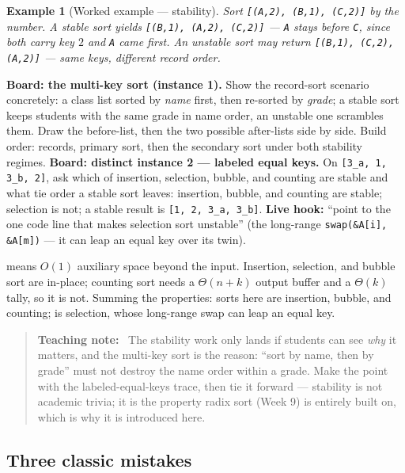 \documentclass[11pt]{article}
\newtheorem{example}{Example}[section]
\newenvironment{teachingaside}{\begin{quote}\small\color{primary-gold}\textbf{Teaching note:}\ }{\end{quote}}
\begin{document}
\begin{example}[Worked example --- stability]
Sort \texttt{[(A,2), (B,1), (C,2)]} by the number. A stable sort yields \texttt{[(B,1), (A,2), (C,2)]} --- \texttt{A} stays before \texttt{C}, since both carry key $2$ and \texttt{A} came first. An unstable sort may return \texttt{[(B,1), (C,2), (A,2)]} --- same keys, different record order.
\end{example}

\textbf{Board: the multi-key sort (instance 1).} Show the record-sort scenario concretely: a class list sorted by \emph{name} first, then re-sorted by \emph{grade}; a stable sort keeps students with the same grade in name order, an unstable one scrambles them. Draw the before-list, then the two possible after-lists side by side. Build order: records, primary sort, then the secondary sort under both stability regimes. \textbf{Board: distinct instance 2 --- labeled equal keys.} On \texttt{[3\_a, 1, 3\_b, 2]}, ask which of insertion, selection, bubble, and counting are stable and what tie order a stable sort leaves: insertion, bubble, and counting are stable; selection is not; a stable result is \texttt{[1, 2, 3\_a, 3\_b]}. \textbf{Live hook:} ``point to the one code line that makes selection sort unstable'' (the long-range \texttt{swap(\&A[i], \&A[m])} --- it can leap an equal key over its twin).

 means $O(1)$ auxiliary space beyond the input. Insertion, selection, and bubble sort are in-place; counting sort needs a $\Theta(n+k)$ output buffer and a $\Theta(k)$ tally, so it is not. Summing the properties:  sorts here are insertion, bubble, and counting;  is selection, whose long-range swap can leap an equal key.

\begin{teachingaside}
The stability work only lands if students can see \emph{why} it matters, and the multi-key sort is the reason: ``sort by name, then by grade'' must not destroy the name order within a grade. Make the point with the labeled-equal-keys trace, then tie it forward --- stability is not academic trivia; it is the property radix sort (Week 9) is entirely built on, which is why it is introduced here.
\end{teachingaside}

\subsection{Three classic mistakes}
\end{document}
